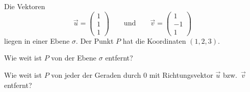 Die Vektoren
\[
\vec u=\begin{pmatrix}1\\1\\1\end{pmatrix}
\qquad\text{und}\qquad
\vec v=\begin{pmatrix}1\\-1\\1\end{pmatrix}
\]
liegen in einer Ebene $\sigma$. Der Punkt $P$ hat die Koordinaten $(1,2,3)$.
\begin{teilaufgaben}
\item Wie weit ist $P$ von der Ebene $\sigma$ entfernt?
\item Wie weit ist $P$ von jeder der Geraden durch $0$ mit Richtungsvektor
$\vec{u}$ bzw.~$\vec{v}$ entfernt?
\end{teilaufgaben}


